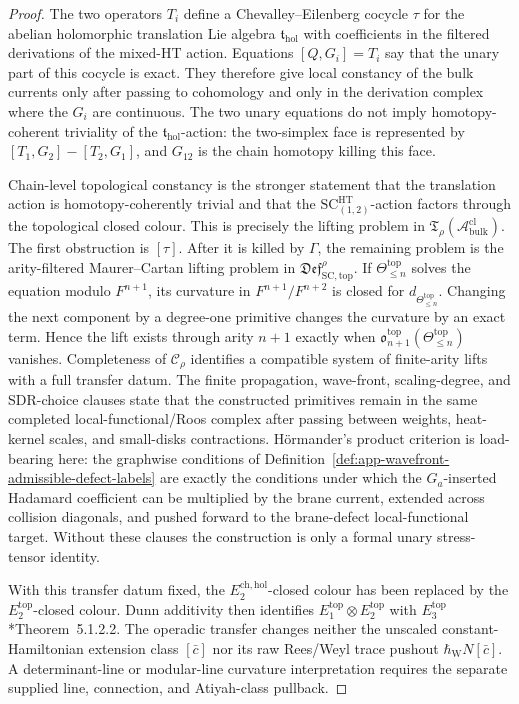 \begin{proof}
The two operators \(T_i\) define a Chevalley--Eilenberg cocycle
\(\tau\) for the abelian holomorphic translation Lie algebra
\(\mathfrak t_{\mathrm{hol}}\) with coefficients in the filtered
derivations of the mixed-HT action.  Equations
\([Q,G_i]=T_i\) say that the unary part of this cocycle is exact.  They
therefore give local constancy of the bulk currents only after passing
to cohomology and only in the derivation complex where the \(G_i\) are
continuous.  The two unary equations do not imply homotopy-coherent
triviality of the \(\mathfrak t_{\mathrm{hol}}\)-action: the two-simplex
face is represented by \([T_1,G_2]-[T_2,G_1]\), and \(G_{12}\) is the
chain homotopy killing this face.

Chain-level topological constancy is the stronger statement that the
translation action is homotopy-coherently trivial and that the
\(\mathrm{SC}^{\mathrm{HT}}_{(1,2)}\)-action factors through the
topological closed colour.  This is precisely the lifting problem in
\(\mathfrak T_\rho(\mathcal A^{\mathrm{cl}}_{\mathrm{bulk}})\).  The
first obstruction is \([\tau]\).  After it is killed by \(\Gamma\), the
remaining problem is the arity-filtered Maurer--Cartan lifting problem in
\(\mathfrak{Def}^{\rho}_{\mathrm{SC},\mathrm{top}}\).  If
\(\Theta^{\mathrm{top}}_{\le n}\) solves the equation modulo
\(F^{n+1}\), its curvature in
\(F^{n+1}/F^{n+2}\) is closed for
\(d_{\Theta^{\mathrm{top}}_{\le n}}\).  Changing the next component by a
degree-one primitive changes the curvature by an exact term.  Hence the
lift exists through arity \(n+1\) exactly when
\(\mathfrak o^{\mathrm{top}}_{n+1}(\Theta^{\mathrm{top}}_{\le n})\)
vanishes.  Completeness of \(\mathcal C_\rho\) identifies a compatible
system of finite-arity lifts with a full transfer datum.  The finite
  propagation, wave-front, scaling-degree, and SDR-choice clauses state
  that the constructed primitives remain in the same completed
  local-functional/Roos complex after passing between weights, heat-kernel
  scales, and small-disks contractions.  H\"ormander's product criterion is
  load-bearing here: the graphwise conditions of
  Definition~\ref{def:app-wavefront-admissible-defect-labels} are exactly
  the conditions under which the \(G_a\)-inserted Hadamard coefficient can
  be multiplied by the brane current, extended across collision diagonals,
  and pushed forward to the brane-defect local-functional target.  Without
  these clauses the construction is only a formal unary stress-tensor
  identity.

With this transfer datum fixed, the \(E_2^{\mathrm{ch,hol}}\)-closed colour
has been replaced by the \(E_2^{\mathrm{top}}\)-closed colour.  Dunn
additivity then identifies
\(E_1^{\mathrm{top}}\otimes E_2^{\mathrm{top}}\) with
\(E_3^{\mathrm{top}}\)
\cite{lurie-ha}*{Theorem~5.1.2.2}.  The operadic transfer changes neither
the unscaled constant-Hamiltonian extension class \([\bar c]\) nor its
raw Rees/Weyl trace pushout
\(\hbar_{\mathrm{W}}N[\bar c]\).  A determinant-line or modular-line
curvature interpretation requires the separate supplied line,
connection, and Atiyah-class pullback.
\end{proof}

